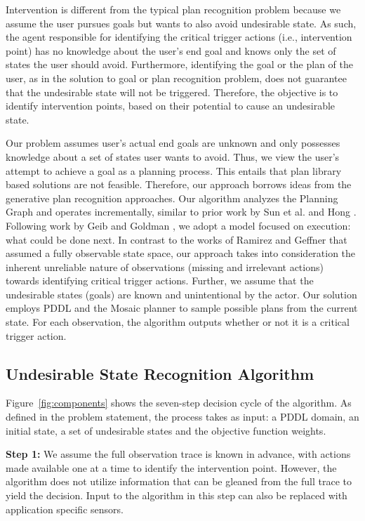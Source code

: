 Intervention is different from the typical plan recognition problem because we assume the user pursues goals but wants to also avoid undesirable state. As such, the agent responsible for identifying the critical trigger actions (i.e., intervention point) has no knowledge about the user's end goal and knows only the set of states the user should avoid. Furthermore, identifying the goal or the plan of the user, as in the solution to goal or plan recognition problem, does not guarantee that the undesirable state will not be triggered. Therefore, the objective is to identify intervention points, based on their potential to cause an undesirable state.

Our problem assumes user's actual end goals are unknown and only possesses knowledge about a set of states user wants to avoid. Thus, we view the user's attempt to achieve a goal as a planning process. This entails that plan library based solutions are not feasible. Therefore, our approach borrows ideas from the generative plan recognition approaches. Our algorithm analyzes the Planning Graph and operates incrementally, similar to prior work by Sun et al.  and Hong . Following work by Geib and Goldman , we adopt a model focused on execution: what could be done next. In contrast to the works of Ramirez and Geffner  that assumed a fully observable state space, our approach takes into consideration the inherent unreliable nature of observations (missing and irrelevant actions) towards identifying critical trigger actions. 
Further, we assume that the undesirable states (goals) are known and unintentional by the actor. Our solution employs PDDL and the Mosaic planner \cite{roberts2014} to sample possible plans from the current state. For each observation, the algorithm outputs whether or not it is a critical trigger action. 

\subsection{Undesirable State Recognition Algorithm}
Figure~\ref{fig:components} shows the seven-step decision cycle of the algorithm. As defined in the problem statement, the process takes as input: a PDDL domain, an initial state, a set of undesirable states and the objective function weights. 

\textbf{Step 1:} We assume the full observation trace is known in advance, with actions made available one at a time to identify the intervention point. However, the algorithm does not utilize information that can be gleaned from the full trace to yield the decision. Input to the algorithm in this step can also be replaced with application specific sensors.  

